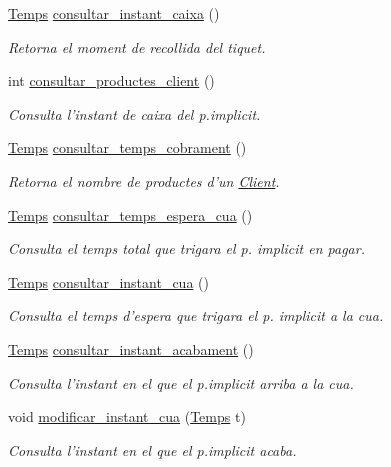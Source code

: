 \begin{DoxyCompactItemize}
\hyperlink{class_temps}{Temps} \hyperlink{class_client_a5b08c2bce4406280925869212a0831d9}{consultar\-\_\-instant\-\_\-caixa} ()
\begin{DoxyCompactList}\small\item\em Retorna el moment de recollida del tiquet. \end{DoxyCompactList}\item 
int \hyperlink{class_client_af3c1754dbbd0593c30cb6ffa8ddef086}{consultar\-\_\-productes\-\_\-client} ()
\begin{DoxyCompactList}\small\item\em Consulta l'instant de caixa del p.\-implicit. \end{DoxyCompactList}\item 
\hyperlink{class_temps}{Temps} \hyperlink{class_client_a2ccbf48235fab996aff2bb9d31e03b67}{consultar\-\_\-temps\-\_\-cobrament} ()
\begin{DoxyCompactList}\small\item\em Retorna el nombre de productes d'un \hyperlink{class_client}{Client}. \end{DoxyCompactList}\item 
\hyperlink{class_temps}{Temps} \hyperlink{class_client_a94e4cd3e3d2c3e675d9e722a7e402963}{consultar\-\_\-temps\-\_\-espera\-\_\-cua} ()
\begin{DoxyCompactList}\small\item\em Consulta el temps total que trigara el p. implicit en pagar. \end{DoxyCompactList}\item 
\hyperlink{class_temps}{Temps} \hyperlink{class_client_a0a7ef70f7ad923d76f0982aa616ebf0c}{consultar\-\_\-instant\-\_\-cua} ()
\begin{DoxyCompactList}\small\item\em Consulta el temps d'espera que trigara el p. implicit a la cua. \end{DoxyCompactList}\item 
\hyperlink{class_temps}{Temps} \hyperlink{class_client_a0f893a0ad60702dacd2c2502d6b2aec3}{consultar\-\_\-instant\-\_\-acabament} ()
\begin{DoxyCompactList}\small\item\em Consulta l'instant en el que el p.\-implicit arriba a la cua. \end{DoxyCompactList}\item 
void \hyperlink{class_client_afb5ec40f5410ec9766ca3c225add1d93}{modificar\-\_\-instant\-\_\-cua} (\hyperlink{class_temps}{Temps} t)
\begin{DoxyCompactList}\small\item\em Consulta l'instant en el que el p.\-implicit acaba. \end{DoxyCompactList}\item 

\end{DoxyCompactItemize}
